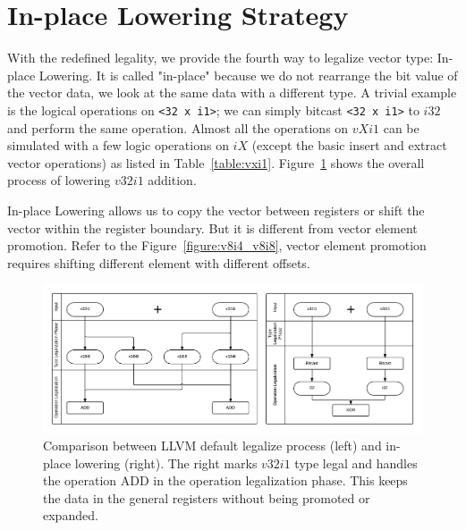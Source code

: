 \section{In-place Lowering Strategy}

With the redefined legality, we provide the fourth way to legalize vector type: In-place Lowering. It is called "in-place" because we do not rearrange the bit value of the vector data, we look at the same data with a different type. A trivial example is the logical operations on \verb|<32 x i1>|; we can simply bitcast \verb|<32 x i1>| to $i32$ and perform the same operation. Almost all the operations on $vXi1$ can be simulated with a few logic operations on $iX$ (except the basic insert and extract vector operations) as listed in Table~\ref{table:vxi1}. Figure~\ref{figure:v32i1_compare} shows the overall process of lowering $v32i1$ addition.

In-place Lowering allows us to copy the vector between registers or shift the vector within the register boundary. But it is different from vector element promotion. Refer to the Figure~\ref{figure:v8i4_v8i8}, vector element promotion requires shifting different element with different offsets.

\begin{figure}[ht!]
  \centering
  \includegraphics[width=150mm]{draw/v32i1_compare.png}
  \caption[Comparison between LLVM default legalize process and in-place lowering.]{Comparison between LLVM default legalize process (left) and in-place lowering (right). The right marks $v32i1$ type legal and handles the operation ADD in the operation legalization phase. This keeps the data in the general registers without being promoted or expanded.}
  \label{figure:v32i1_compare}
\end{figure}

